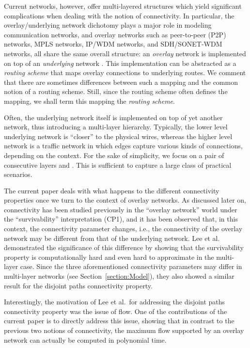 \LongVersion \documentclass[11pt]{article}
\theoremstyle{definition}
\theoremstyle{plain}
\begin{document}
Current networks, however, offer multi-layered structures which yield
significant complications when dealing with the notion of connectivity.
In particular, the overlay/underlying network dichotomy plays a major role
in modeling communication networks, and overlay networks such as peer-to-peer
(P2P) networks, MPLS networks, IP/WDM networks, and SDH/SONET-WDM networks,
all share the same overall structure:
an \emph{overlay} network  is implemented on top of an \emph{underlying}
network .
This implementation can be abstracted as a \emph{routing scheme} that maps
overlay connections to underlying routes.
We comment that there are sometimes differences between such a mapping and the common notion of a routing scheme. Still, since the routing scheme often defines the mapping,
we shall term this mapping the
\emph{routing scheme}.

Often, the underlying network itself is implemented on top of yet another
network, thus introducing a multi-layer hierarchy.
Typically, the lower level underlying network is ``closer'' to the physical
wires, whereas the higher level network is a traffic network in which edges
capture various kinds of connections, depending on the context.
For the sake of simplicity, we focus on a pair of consecutive layers  and
.
This is sufficient to capture a large class of practical scenarios.

The current paper deals with what happens to the different connectivity
properties once we turn to the context of overlay networks.
As discussed later on, connectivity has been studied previously in the
``overlay network'' world under the ``survivability'' interpretation (CP1),
and it has been observed that, in this context, the connectivity parameter
changes, i.e., the connectivity of the overlay network may be different
from that of the underlying network.
Lee et al.\ \cite{prev} demonstrated the significance of this difference by
showing that the survivability property is computationally hard and even hard
to approximate in the multi-layer case.
Since the three aforementioned connectivity parameters may differ in
multi-layer networks (see Section~\ref{section:Model}), they also showed a
similar result for the disjoint paths connectivity property.

Interestingly, the motivation of Lee et al.\ for addressing the disjoint paths
connectivity property was the issue of flow.
One of the contributions of the current paper is to directly address this
issue, showing that in contrast to the previous two notions of connectivity,
the maximum flow supported by an overlay network can actually be computed in
polynomial time.
\end{document}
